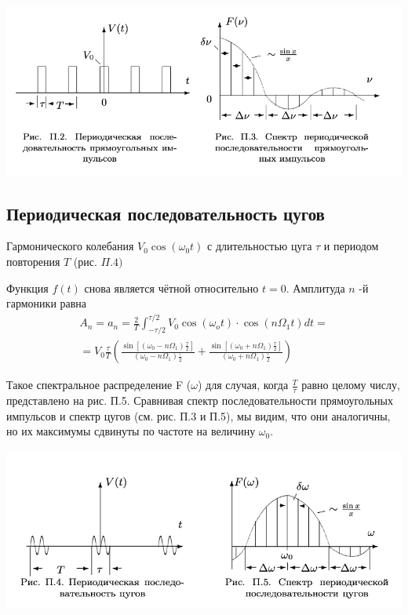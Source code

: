  \begin{center}
\includegraphics[width=0.7\linewidth]{2.jpg}\\
\end{center}

\subsection{Периодическая последовательность цугов}
Гармонического колебания $V_{0} \cos \left(\omega_{0} t\right)$ с длительностью цуга $\tau$ и периодом повторения $T$ (рис. $\Pi .4)$
 
Функция $f(t)$ снова является чётной относительно $t=0 .$ Амплитуда $n$ -й гармоники равна
$$
\begin{array}{c}
A_{n}=a_{n}=\frac{2}{T} \int_{-\tau / 2}^{\tau / 2} V_{0} \cos \left(\omega_{o} t\right) \cdot \cos \left(n \Omega_{1} t\right) d t= \\
=V_{0} \frac{\tau}{T}\left(\frac{\sin \left[\left(\omega_{0}-n \Omega_{1}\right) \frac{\tau}{2}\right]}{\left(\omega_{0}-n \Omega_{1}\right) \frac{\tau}{2}}+\frac{\sin \left[\left(\omega_{0}+n \Omega_{1}\right) \frac{\tau}{2}\right]}{\left(\omega_{0}+n \Omega_{1}\right) \frac{\tau}{2}}\right)
\end{array}
$$

Такое спектральное распределение F ($\omega$) для случая, когда $\frac T\tau$ равно целому числу, представлено на рис. П.5. Сравнивая спектр последовательности прямоугольных импульсов и спектр цугов (см. рис. П.3 и П.5), мы видим, что они аналогичны, но их максимумы сдвинуты по частоте на величину $\omega_0$.

\begin{center}
\includegraphics[width=0.7\linewidth]{3.jpg}\\
\end{center}

